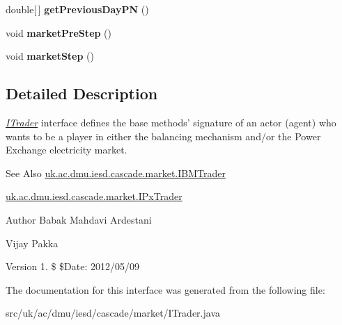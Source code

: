 \begin{DoxyCompactItemize}
\item 
\hypertarget{interfaceuk_1_1ac_1_1dmu_1_1iesd_1_1cascade_1_1market_1_1_i_trader_a636ced4cdf792948171a1e45bf07ff62}{double\mbox{[}$\,$\mbox{]} {\bfseries get\-Previous\-Day\-P\-N} ()}\label{interfaceuk_1_1ac_1_1dmu_1_1iesd_1_1cascade_1_1market_1_1_i_trader_a636ced4cdf792948171a1e45bf07ff62}

\item 
\hypertarget{interfaceuk_1_1ac_1_1dmu_1_1iesd_1_1cascade_1_1market_1_1_i_trader_ab8df4fcc053cd661681ef2a03be52540}{void {\bfseries market\-Pre\-Step} ()}\label{interfaceuk_1_1ac_1_1dmu_1_1iesd_1_1cascade_1_1market_1_1_i_trader_ab8df4fcc053cd661681ef2a03be52540}

\item 
\hypertarget{interfaceuk_1_1ac_1_1dmu_1_1iesd_1_1cascade_1_1market_1_1_i_trader_a3e49269838f730831a756f2611f45d81}{void {\bfseries market\-Step} ()}\label{interfaceuk_1_1ac_1_1dmu_1_1iesd_1_1cascade_1_1market_1_1_i_trader_a3e49269838f730831a756f2611f45d81}

\end{DoxyCompactItemize}


\subsection{Detailed Description}
{\itshape \hyperlink{interfaceuk_1_1ac_1_1dmu_1_1iesd_1_1cascade_1_1market_1_1_i_trader}{I\-Trader}} interface defines the base methods' signature of an actor (agent) who wants to be a player in either the balancing mechanism and/or the {\ttfamily Power Exchange} electricity market. 

\begin{DoxySeeAlso}{See Also}
\hyperlink{interfaceuk_1_1ac_1_1dmu_1_1iesd_1_1cascade_1_1market_1_1_i_b_m_trader}{uk.\-ac.\-dmu.\-iesd.\-cascade.\-market.\-I\-B\-M\-Trader} 

\hyperlink{interfaceuk_1_1ac_1_1dmu_1_1iesd_1_1cascade_1_1market_1_1_i_px_trader}{uk.\-ac.\-dmu.\-iesd.\-cascade.\-market.\-I\-Px\-Trader}
\end{DoxySeeAlso}
\begin{DoxyAuthor}{Author}
Babak Mahdavi Ardestani 

Vijay Pakka 
\end{DoxyAuthor}
\begin{DoxyVersion}{Version}
1. \$ \$\-Date\-: 2012/05/09 
\end{DoxyVersion}


The documentation for this interface was generated from the following file\-:\begin{DoxyCompactItemize}
\item 
src/uk/ac/dmu/iesd/cascade/market/I\-Trader.\-java\end{DoxyCompactItemize}
